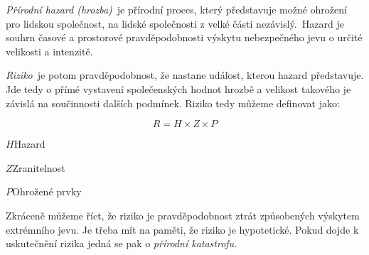\emph{Přírodní hazard (hrozba)} je přírodní proces, který představuje možné ohrožení pro lidskou společnost, na lidské společnosti z velké části nezávislý. Hazard je souhrn časové a prostorové pravděpodobnosti výskytu nebezpečného jevu o určité velikosti a intenzitě.

\emph{Riziko} je potom pravděpodobnost, že nastane událost, kterou hazard představuje. Jde tedy o přímé vystavení společenských hodnot hrozbě a velikost takového je závislá na součinnosti dalších podmínek.
Riziko tedy můžeme definovat jako:

\begin{equation}\label{key}
	R = H \times Z \times P
\end{equation}

\begin{eqexpl}
	\item{$H$}Hazard
	\item{$Z$}Zranitelnost 
	\item{$P$}Ohrožené prvky
\end{eqexpl}
Zkráceně můžeme říct, že riziko je pravděpodobnost ztrát způsobených výskytem extrémního jevu. Je třeba mít na paměti, že riziko je hypotetické. Pokud dojde k uskutečnění rizika jedná se pak o \emph{přírodní katastrofu}.



